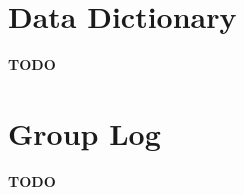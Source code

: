 \documentclass{article}
\newcommand{\todo}{{\LARGE\color{red}\textbf{TODO}}}
\begin{document}
\pagebreak
\appendix

\section{Data Dictionary}
    \todo

\pagebreak
\section{Group Log}
    \todo

\end{document}
